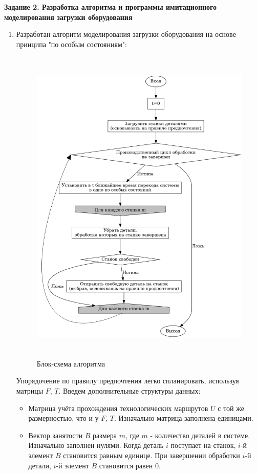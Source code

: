 \documentclass[a4paper,12pt]{article}
\begin{document}
\begin{flushleft}
\textbf{Задание 2. Разработка алгоритма и программы имитационного
  моделирования загрузки оборудования }
  \justify
  \begin{enumerate}
    \item Разработан алгоритм моделирования загрузки оборудования на основе принципа "по особым состояниям":
    \begin{figure}[H]
      \includegraphics[width=15.25cm,height=15.5cm]{algorithm.png}
      \centering
      \caption{\small{Блок-схема алгоритма}}
  \end{figure}
  Упорядочение по правилу предпочтения легко спланировать, используя матрицы $F$, $T$. Введем дополнительные структуры данных:
  \begin{itemize}
    \item Матрица учёта прохождения технологических маршрутов $U$ с той же размерностью, что и у $F$, $T$. Изначально матрица заполнена единицами.
    \item Вектор занятости $B$ размера $m$, где $m$ - количество деталей в системе. Изначально заполнен нулями. Когда деталь $i$ поступает на станок, $i$-й элемент $B$ становится равным единице. При завершении обработки $i$-й детали, $i$-й элемент $B$ становится равен 0.

\end{itemize}
\end{enumerate}
\end{flushleft}
\end{document}
